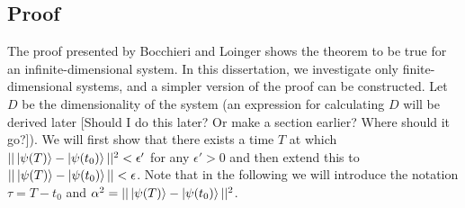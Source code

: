 \documentclass[a4paper,10pt]{article}
\begin{document}
\subsection{Proof}
The proof presented by Bocchieri and Loinger shows the theorem to be true for an infinite-dimensional system. In this dissertation, we investigate only finite-dimensional systems, and a simpler version of 
the proof can be constructed. Let $D$ be the dimensionality of the system (an expression for calculating $D$ will be derived later [Should I do this later? Or make a section earlier? Where should it go?]).
We will first show that there exists a time $T$ at which $||\ket{\psi(T)}-\ket{\psi(t_0)}||^2<\epsilon'$ for any $\epsilon'>0$ and then extend this to $||\ket{\psi(T)}-\ket{\psi(t_0)}||<\epsilon$. Note that in
the following we will introduce the notation $\tau=T-t_0$ and $\alpha^2=||\ket{\psi(T)}-\ket{\psi(t_0)}||^2$.
\end{document}
